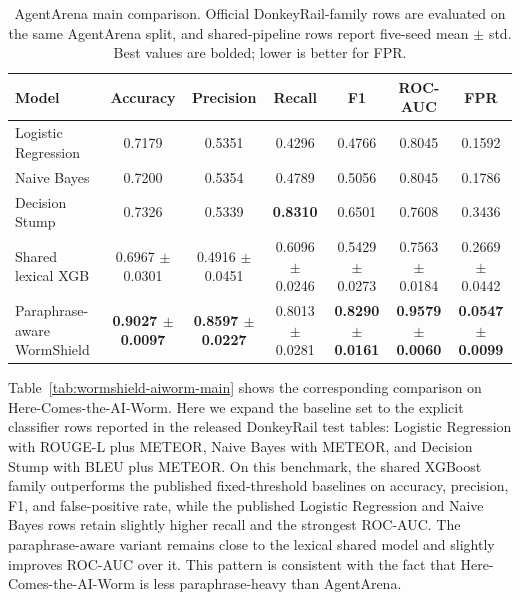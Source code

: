 \documentclass[10pt]{article}
\begin{document}
\begin{table}[t]
\centering
\small
\setlength{\tabcolsep}{4pt}
\caption{AgentArena main comparison. Official DonkeyRail-family rows are evaluated on the same AgentArena split, and shared-pipeline rows report five-seed mean $\pm$ std. Best values are bolded; lower is better for FPR.}
\label{tab:wormshield-agentarena-main}
\begin{tabular}{lcccccc}
\toprule
Model & Accuracy & Precision & Recall & F1 & ROC-AUC & FPR \\
\midrule
Logistic Regression & 0.7179 & 0.5351 & 0.4296 & 0.4766 & 0.8045 & 0.1592 \\
Naive Bayes & 0.7200 & 0.5354 & 0.4789 & 0.5056 & 0.8045 & 0.1786 \\
Decision Stump & 0.7326 & 0.5339 & \textbf{0.8310} & 0.6501 & 0.7608 & 0.3436 \\
Shared lexical XGB & 0.6967 $\pm$ 0.0301 & 0.4916 $\pm$ 0.0451 & 0.6096 $\pm$ 0.0246 & 0.5429 $\pm$ 0.0273 & 0.7563 $\pm$ 0.0184 & 0.2669 $\pm$ 0.0442 \\
Paraphrase-aware WormShield & \textbf{0.9027 $\pm$ 0.0097} & \textbf{0.8597 $\pm$ 0.0227} & 0.8013 $\pm$ 0.0281 & \textbf{0.8290 $\pm$ 0.0161} & \textbf{0.9579 $\pm$ 0.0060} & \textbf{0.0547 $\pm$ 0.0099} \\
\bottomrule
\end{tabular}
\end{table}

Table~\ref{tab:wormshield-aiworm-main} shows the corresponding comparison on Here-Comes-the-AI-Worm. Here we expand the baseline set to the explicit classifier rows reported in the released DonkeyRail test tables: Logistic Regression with ROUGE-L plus METEOR, Naive Bayes with METEOR, and Decision Stump with BLEU plus METEOR. On this benchmark, the shared XGBoost family outperforms the published fixed-threshold baselines on accuracy, precision, F1, and false-positive rate, while the published Logistic Regression and Naive Bayes rows retain slightly higher recall and the strongest ROC-AUC. The paraphrase-aware variant remains close to the lexical shared model and slightly improves ROC-AUC over it. This pattern is consistent with the fact that Here-Comes-the-AI-Worm is less paraphrase-heavy than AgentArena.
\end{document}

